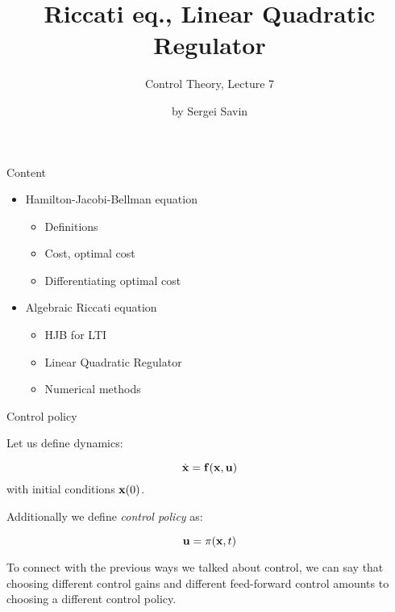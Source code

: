 \documentclass{beamer}
\title{Riccati eq., Linear Quadratic Regulator}
\subtitle{Control Theory, Lecture 7}
\author{by Sergei Savin}
\date{\mydate}
\begin{document}
\maketitle


\begin{frame}{Content}
\begin{itemize}
\item Hamilton-Jacobi-Bellman equation
\begin{itemize}
    \item Definitions
    \item Cost, optimal cost
    \item Differentiating optimal cost
\end{itemize}
\item Algebraic Riccati equation
\begin{itemize}
    \item HJB for LTI
    \item Linear Quadratic Regulator
    \item Numerical methods
\end{itemize}
\end{itemize}
\end{frame}

\begin{frame}{Control policy}
\begin{flushleft}

Let us define dynamics:

\begin{equation}
    \dot {\mathbf{x}} = \mathbf{f} (\mathbf{x}, \mathbf{u})
\end{equation}
%
with initial conditions $\mathbf{x}(0)$. 

\bigskip

Additionally we define \emph{control policy} as:

\begin{equation}
    \mathbf{u} = \pi (\mathbf{x}, t)
\end{equation}

To connect with the previous ways we talked about control, we can say that choosing different control gains and different feed-forward control amounts to choosing a different control policy.

\end{flushleft}
\end{frame}
\end{document}
